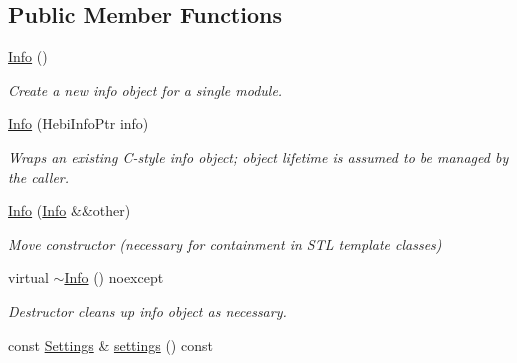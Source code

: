 \subsection*{Public Member Functions}
\begin{DoxyCompactItemize}
\item 
\hyperlink{classhebi_1_1Info_a3d7965dca75a442e1e67c6623df8949e}{Info} ()\hypertarget{classhebi_1_1Info_a3d7965dca75a442e1e67c6623df8949e}{}\label{classhebi_1_1Info_a3d7965dca75a442e1e67c6623df8949e}

\begin{DoxyCompactList}\small\item\em Create a new info object for a single module. \end{DoxyCompactList}\item 
\hyperlink{classhebi_1_1Info_aa0b53c4d5b50d020197b10265e7d4040}{Info} (Hebi\+Info\+Ptr info)
\begin{DoxyCompactList}\small\item\em Wraps an existing C-\/style info object; object lifetime is assumed to be managed by the caller. \end{DoxyCompactList}\item 
\hyperlink{classhebi_1_1Info_a3e41324a9797031b0b4a5e8303cf5fe3}{Info} (\hyperlink{classhebi_1_1Info}{Info} \&\&other)\hypertarget{classhebi_1_1Info_a3e41324a9797031b0b4a5e8303cf5fe3}{}\label{classhebi_1_1Info_a3e41324a9797031b0b4a5e8303cf5fe3}

\begin{DoxyCompactList}\small\item\em Move constructor (necessary for containment in S\+TL template classes) \end{DoxyCompactList}\item 
virtual \hyperlink{classhebi_1_1Info_aaee3a5f528ad0a69c2f9fcd42bba47f5}{$\sim$\+Info} () noexcept\hypertarget{classhebi_1_1Info_aaee3a5f528ad0a69c2f9fcd42bba47f5}{}\label{classhebi_1_1Info_aaee3a5f528ad0a69c2f9fcd42bba47f5}

\begin{DoxyCompactList}\small\item\em Destructor cleans up info object as necessary. \end{DoxyCompactList}\item 
const \hyperlink{classhebi_1_1Info_1_1Settings}{Settings} \& \hyperlink{classhebi_1_1Info_a525857bd4d48eb01fda9da87176fff14}{settings} () const \hypertarget{classhebi_1_1Info_a525857bd4d48eb01fda9da87176fff14}{}\label{classhebi_1_1Info_a525857bd4d48eb01fda9da87176fff14}


\end{DoxyCompactItemize}
